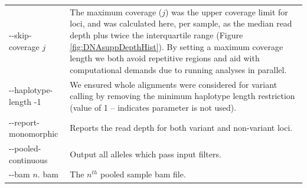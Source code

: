 \begin{table}[!htbp]
\begin{center}
\begin{tabular}{p{}p{}}
-{}-skip-coverage $j$ & The maximum coverage ($j$) was the upper coverage limit for loci, and was calculated here, per sample, as the median read depth plus twice the interquartile range (Figure \ref{fig:DNAsuppDepthHist}). By setting a maximum coverage length we both avoid repetitive regions and aid with computational demands due to running analyses in parallel.\\
-{}-haplotype-length -1 &	We ensured whole alignments were considered for variant calling by removing the minimum haplotype length restriction (value of 1 – indicates parameter is not used).\\
-{}-report-monomorphic &	Reports the read depth for both variant and non-variant loci.\\
-{}-pooled-continuous &	Output all alleles which pass input filters.\\
-{}-bam $n$. bam	& The $n^{th}$ pooled sample bam file.\\
\bottomrule
\end{tabular}
\end{center}
\end{table}

